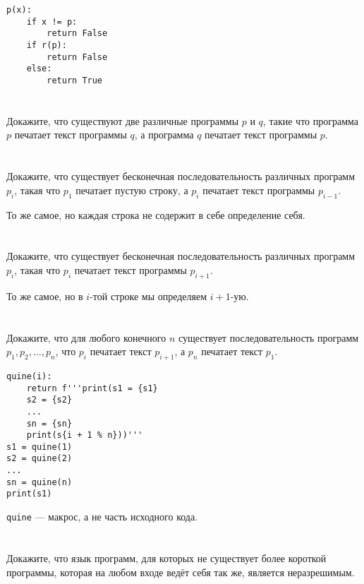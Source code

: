 \begin{verbatim}
p(x):
    if x != p:
        return False
    if r(p):
        return False
    else:
        return True
\end{verbatim}

\section{}
Докажите, что существуют две различные программы $p$ и $q$, такие что программа $p$ печатает текст программы $q$, а программа $q$ печатает текст программы $p$.

\section{}
Докажите, что существует бесконечная последовательность различных программ $p_i$, такая что $p_1$ печатает пустую строку, а $p_i$ печатает текст программы $p_{i-1}$.

То же самое, но каждая строка не содержит в себе определение себя.

\section{}
Докажите, что существует бесконечная последовательность различных программ $p_i$, такая что $p_i$ печатает текст программы $p_{i+1}$.

То же самое, но в \(i\)-той строке мы определяем \(i + 1\)-ую.

\section{}
Докажите, что для любого конечного $n$ существует последовательность программ $p_1, p_2, \ldots, p_n$, что $p_i$ печатает текст $p_{i+1}$, а $p_n$ печатает текст $p_1$.

\begin{verbatim}
quine(i):
    return f'''print(s1 = {s1}
    s2 = {s2}
    ...
    sn = {sn}
    print(s{i + 1 % n}))'''
s1 = quine(1)
s2 = quine(2)
...
sn = quine(n)
print(s1)
\end{verbatim}

\texttt{quine} --- макрос, а не часть исходного кода.


\section{}
Докажите, что язык программ, для которых не существует более короткой программы, которая на любом входе ведёт себя так же, является неразрешимым.

